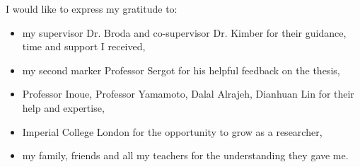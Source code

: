 
\cleardoublepage


\begin{acknowledgements}

I would like to express my gratitude to:

\begin{itemize}
 \item my supervisor Dr. Broda and co-supervisor Dr. Kimber for their guidance, time and support I received,
 \vspace*{3mm}
 \item my second marker Professor Sergot for his helpful feedback on the thesis,
 \vspace*{3mm}
 \item Professor Inoue, Professor Yamamoto, Dalal Alrajeh, Dianhuan Lin for their help and expertise,
 \vspace*{3mm}
  \item Imperial College London for the opportunity to grow as a researcher,
 \vspace*{3mm} 
 \item my family, friends and all my teachers for the understanding they gave me.
\end{itemize}

\end{acknowledgements}
